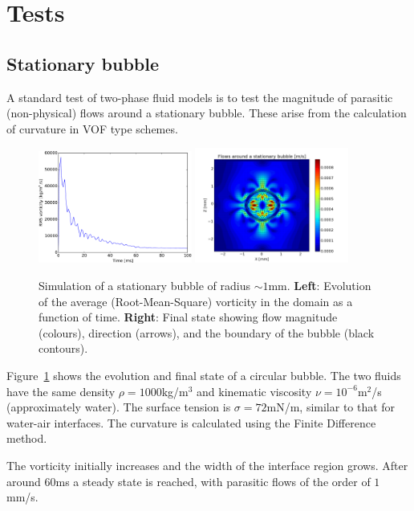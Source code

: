 \documentclass[12pt,a4paper]{article}
\begin{document}
\section{Tests}

\subsection{Stationary bubble}

A standard test of two-phase fluid models is to test the
magnitude of parasitic (non-physical) flows around a stationary bubble. These arise from the calculation of curvature in VOF type schemes.
\begin{figure}[h]
\centering
\includegraphics[width=0.45\textwidth]{bubble_vorticity.pdf}
\includegraphics[width=0.45\textwidth]{bubble_flows.png}
\caption{Simulation of a stationary bubble of radius $\sim 1$mm. {\bf Left}: Evolution of the average (Root-Mean-Square) vorticity in the domain as a function of time. {\bf Right}: Final state showing flow magnitude (colours), direction (arrows), and the boundary of the bubble (black contours).}
\label{fig:bubble}
\end{figure}
Figure~\ref{fig:bubble} shows the evolution and final state of
a circular bubble. The two fluids have the same density $\rho=1000$kg/m$^3$ and kinematic viscosity $\nu=10^{-6}$m$^2$/s (approximately water). The surface tension is $\sigma=72$mN/m, similar to that for water-air interfaces. The curvature is calculated using the Finite Difference method. 

The vorticity initially increases and the width of the interface region grows. After around $60$ms a steady state is reached, with parasitic flows of the order of $1$mm/s.
\end{document}
